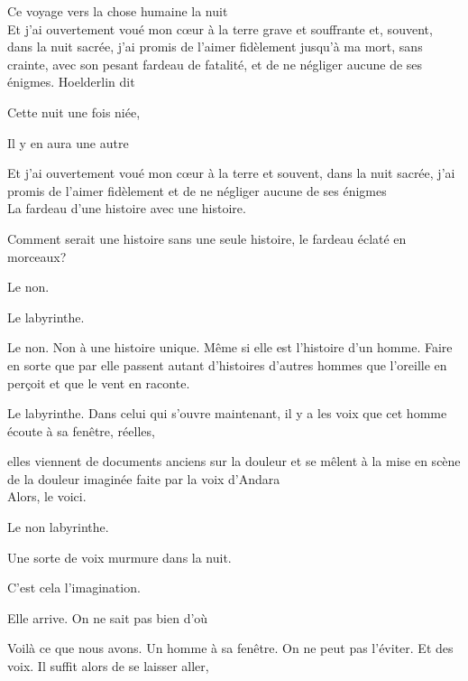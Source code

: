 \pagebreak

\clearpage
\thispagestyle{empty}
\movetooddpage

\vspace*{4cm}

Ce voyage vers la chose humaine la nuit\\

Et j'ai ouvertement voué mon cœur à la terre grave et souffrante et,
souvent, dans la nuit sacrée, j'ai promis de l'aimer fidèlement jusqu'à
ma mort, sans crainte, avec son pesant fardeau de fatalité, et de ne
négliger aucune de ses énigmes. Hoelderlin dit

Cette nuit une fois niée,

Il y en aura une autre

Et j'ai ouvertement voué mon cœur à la terre et souvent, dans la nuit
sacrée, j'ai promis de l'aimer fidèlement et de ne négliger aucune de
ses énigmes\\

La fardeau d'une histoire avec une histoire.

Comment serait une histoire sans une seule histoire, le fardeau éclaté
en morceaux?

Le non.

Le labyrinthe.

Le non. Non à une histoire unique. Même si elle est l'histoire d'un
homme. Faire en sorte que par elle passent autant d'histoires d'autres
hommes que l'oreille en perçoit et que le vent en raconte.

Le labyrinthe. Dans celui qui s'ouvre maintenant, il y a les voix que
cet homme écoute à sa fenêtre, réelles,

elles viennent de documents anciens sur la douleur et se mêlent à la
mise en scène de la douleur imaginée faite par la voix d'Andara\\

Alors, le voici.

Le non labyrinthe.

\pagebreak

\vspace*{4cm}

Une sorte de voix murmure dans la nuit.

C'est cela l'imagination.

Elle arrive. On ne sait pas bien d'où

Voilà ce que nous avons. Un homme à sa fenêtre. On ne peut pas l'éviter.
Et des voix. Il suffit alors de se laisser aller,

